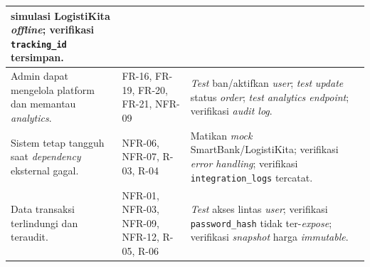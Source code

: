 \begin{longtable}{|L{4cm}|L{3.5cm}|L{7cm}|}
          simulasi LogistiKita \textit{offline}; verifikasi \texttt{tracking\_id}
          tersimpan. \\
    \hline
    Admin dapat mengelola platform dan memantau \textit{analytics}.
        & FR-16, FR-19, FR-20, FR-21, NFR-09
        & \textit{Test} ban/aktifkan \textit{user}; \textit{test} \textit{update}
          status \textit{order}; \textit{test} \textit{analytics endpoint};
          verifikasi \textit{audit log}. \\
    \hline
    Sistem tetap tangguh saat \textit{dependency} eksternal gagal.
        & NFR-06, NFR-07, R-03, R-04
        & Matikan \textit{mock} SmartBank/LogistiKita; verifikasi
          \textit{error handling}; verifikasi \texttt{integration\_logs} tercatat. \\
    \hline
    Data transaksi terlindungi dan teraudit.
        & NFR-01, NFR-03, NFR-09, NFR-12, R-05, R-06
        & \textit{Test} akses lintas \textit{user}; verifikasi
          \texttt{password\_hash} tidak ter-\textit{expose}; verifikasi
          \textit{snapshot} harga \textit{immutable}. \\
    \hline
\end{longtable}
